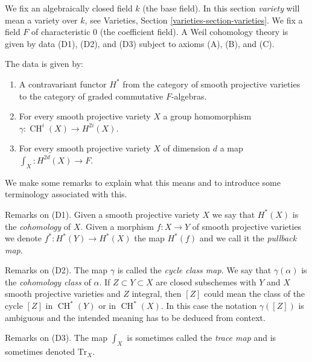 \documentclass{stacks-project}
\theoremstyle{plain}
\theoremstyle{definition}
\theoremstyle{remark}
\numberwithin{equation}{subsection}
\def\CH{\mathop{\mathrm{CH}}\nolimits}
\begin{document}
\medskip\noindent
We fix an algebraically closed field $k$ (the base field).
In this section {\it variety} will mean a variety over $k$, see
Varieties, Section \ref{varieties-section-varieties}.
We fix a field $F$ of characteristic $0$ (the coefficient field).
A Weil cohomology theory is given by data (D1), (D2), and (D3)
subject to axioms (A), (B), and (C).

\medskip\noindent
The data is given by:
\begin{enumerate}
\item[(D1)] A contravariant functor $H^*$ from the category
of smooth projective varieties to the category of
graded commutative $F$-algebras.
\item[(D2)] For every smooth projective variety $X$
a group homomorphism $\gamma : \CH^i(X) \to H^{2i}(X)$.
\item[(D3)] For every smooth projective variety $X$ of dimension $d$
a map $\int_X : H^{2d}(X) \to F$.
\end{enumerate}
We make some remarks to explain what this means and to introduce
some terminology associated with this.

\medskip\noindent
Remarks on (D1). Given a smooth projective variety $X$
we say that $H^*(X)$ is the {\it cohomology} of $X$. Given a morphism
$f : X \to Y$ of smooth projective varieties we denote
$f^* : H^*(Y) \to H^*(X)$ the map $H^*(f)$ and we call it the
{\it pullback map}.

\medskip\noindent
Remarks on (D2). The map $\gamma$ is called the {\it cycle class map}.
We say that $\gamma(\alpha)$ is the {\it cohomology class} of $\alpha$.
If $Z \subset Y \subset X$ are closed subschemes with $Y$ and $X$
smooth projective varieties and $Z$ integral, then $[Z]$ could
mean the class of the cycle $[Z]$ in $\CH^*(Y)$ or in $\CH^*(X)$.
In this case the notation $\gamma([Z])$ is ambiguous and the intended meaning
has to be deduced from context.

\medskip\noindent
Remarks on (D3). The map $\int_X$ is sometimes called the
{\it trace map} and is sometimes denoted $\text{Tr}_X$.
\end{document}
